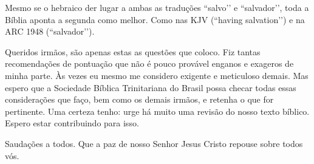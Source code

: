 Mesmo se o hebraico der lugar a ambas as traduções ``salvo’’ e
``salvador’’, toda a Bíblia aponta a segunda como melhor. Como nas KJV
(``having salvation’’) e na ARC 1948 (``salvador’’).


\vspace{24pt}

Queridos irmãos, são apenas estas as questões que coloco. Fiz tantas
recomendações de pontuação que não é pouco provável enganos e exageros
de minha parte. Às vezes eu mesmo me considero exigente e meticuloso
demais. Mas espero que a Sociedade Bíblica Trinitariana do Brasil
possa checar todas essas considerações que faço, bem como os demais
irmãos, e retenha o que for pertinente. Uma certeza tenho: urge há
muito uma revisão do nosso texto bíblico. Espero estar contribuindo
para isso.

\vspace{12pt}

Saudações a todos. Que a paz de nosso Senhor Jesus Cristo repouse
sobre todos vós.


